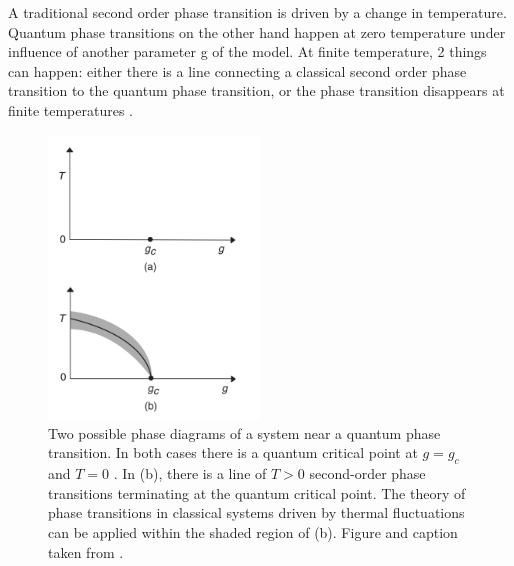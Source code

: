 A traditional second order phase transition is driven by a change in temperature. Quantum phase transitions on the other hand happen at zero temperature under influence of another parameter g of the model. At finite temperature, 2 things can happen: either there is a line connecting a classical second order phase transition to the quantum phase transition, or the phase transition disappears at finite temperatures \cite{Sachdev1999}.

\begin{figure}[H]
    \center
    \includegraphics[width=0.5\textwidth]{Figuren/crit/Screenshot from 2021-05-06 15-58-55.png}
    \caption{ Two possible phase diagrams of a system near a quantum phase transition. In both cases there is a quantum critical point at $g = g_c$ and $T = 0$ . In (b), there is a line of $T > 0$ second-order phase transitions terminating at the quantum critical point. The theory of phase transitions in classical systems driven by thermal fluctuations can be applied within the shaded region of (b).  Figure and caption taken from \cite{Sachdev1999}. }
    \label{fig:crit:qtran}
\end{figure}

